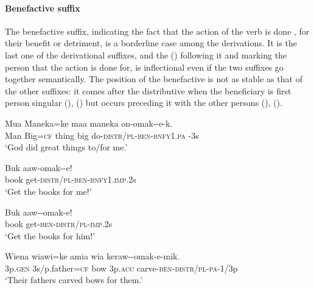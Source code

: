 \paragraph[Benefactive suffix ]{Benefactive suffix} 
{}
The benefactive suffix, indicating the fact that the action of the verb is done , for their benefit or detriment, is a borderline case among the derivations. It is the last one of the derivational suffixes, and the  () following it and marking the person that the action is done for, is inflectional even if the two suffixes go together semantically. The position of the benefactive is not as stable as that of the other suffixes: it comes after the distributive when the beneficiary is first person singular (), () but occurs preceding it with the other persons (), (). 

\ea%
\label{ex:x210}
\gll Mua Maneka=ke maa maneka on-omak--e-k. \\
Man Big=\textsc{cf} thing big do-\textsc{distr}/\textsc{pl}-\textsc{ben}-\textsc{bnfy}1.\textsc{pa}{\footnotemark} -3s \\
\glt`God did great things to/for me.'
\z
{}

\ea%
\label{ex:x1925}
\gll Buk aaw-omak--e! \\
book get-\textsc{distr}/\textsc{pl}-\textsc{ben}-\textsc{bnfy}1.\textsc{imp}.2s\\
\glt`Get the books for me!'
\z

\ea%
\label{ex:x211}
\gll Buk aaw--omak-e! \\
book get-\textsc{ben}-\textsc{distr}/\textsc{pl}-\textsc{imp}.2s \\
\glt`Get the books for him!'
\z

\ea%
\label{ex:x1926}
\gll Wiena wiawi=ke amia wia keraw--omak-e-mik. \\
3p.\textsc{gen} 3s/p.father=\textsc{cf} bow 3p.\textsc{acc} carve-\textsc{ben}-\textsc{distr}/\textsc{pl}-\textsc{pa}-1/3p \\
\glt`Their fathers carved bows for them.'
\z

